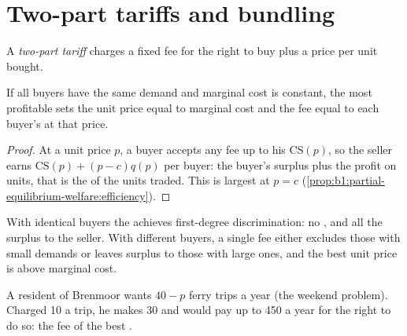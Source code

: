 \section{Two-part tariffs and bundling}\label{sec:b1:monopoly-pricing:tariffs}

\begin{definition}\label{def:b1:monopoly-pricing:two-part}
A \emph{two-part tariff} charges a fixed fee for the right to buy plus a
price per unit bought.
\end{definition}

\begin{proposition}\label{prop:b1:monopoly-pricing:two-part}
If all buyers have the same demand and marginal cost is constant, the most
profitable  sets the unit price equal to marginal cost and
the fee equal to each buyer's  at that price.
\end{proposition}

\begin{proof}
At a unit price $p$, a buyer accepts any fee up to his 
$\mathrm{CS}(p)$, so the seller earns $\mathrm{CS}(p) + (p - c)q(p)$ per buyer: the buyer's
surplus plus the profit on units, that is the  of the units
traded. This is largest at $p = c$ (\cref{prop:b1:partial-equilibrium-welfare:efficiency}).
\end{proof}

With identical buyers the  achieves first-degree
discrimination: no , and all the surplus to the seller.
With different buyers, a single fee either excludes those with small
demands or leaves surplus to those with large ones, and the best unit price
is above marginal cost.

\begin{omfigure}

{\small A resident of Brenmoor wants $40 - p$ ferry trips a year (the weekend
problem). Charged 10 a trip, he makes 30 and would pay up to 450 a year for
the right to do so: the fee of the best .}
\end{omfigure}

